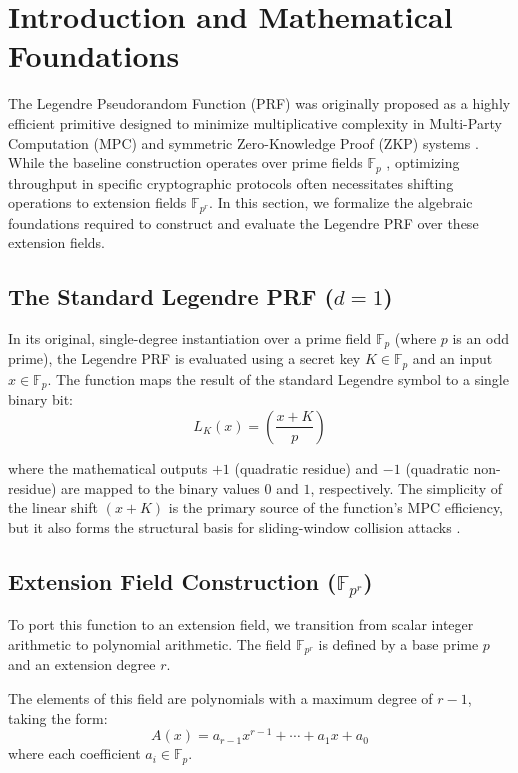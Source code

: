 \documentclass[runningheads]{llncs}
\begin{document}
\section{Introduction and Mathematical Foundations}
The Legendre Pseudorandom Function (PRF) was originally proposed as a highly efficient primitive designed to minimize multiplicative complexity in Multi-Party Computation (MPC) and symmetric Zero-Knowledge Proof (ZKP) systems \cite{grassi2016}. While the baseline construction operates over prime fields $\mathbb{F}_p$ \cite{damgard1988}, optimizing throughput in specific cryptographic protocols often necessitates shifting operations to extension fields $\mathbb{F}_{p^r}.$ In this section, we formalize the algebraic foundations required to construct and evaluate the Legendre PRF over these extension fields.

\subsection{The Standard Legendre PRF ($d = 1$)}
In its original, single-degree instantiation over a prime field $\mathbb{F}_p$ (where $p$ is an odd prime), the Legendre PRF is evaluated using a secret key $K \in \mathbb{F}_p$ and an input $x \in \mathbb{F}_p.$ The function maps the result of the standard Legendre symbol to a single binary bit:   
\begin{equation*}
    L_K(x) = \left(\frac{x + K}{p}\right)
\end{equation*}

where the mathematical outputs $+1$ (quadratic residue) and $-1$ (quadratic non-residue) are mapped to the binary values $0$ and $1$, respectively. The simplicity of the linear shift $(x + K)$ is the primary source of the function's MPC efficiency, but it also forms the structural basis for sliding-window collision attacks \cite{khovratovich2019,beullens2019}. 

\subsection{Extension Field Construction ($\mathbb{F}_{p^r}$)}
To port this function to an extension field, we transition from scalar integer arithmetic to polynomial arithmetic. The field $\mathbb{F}_{p^r}$ is defined by a base prime $p$ and an extension degree $r$.

The elements of this field are polynomials with a maximum degree of $r - 1$, taking the form: 
\begin{equation*}
    A(x) = a_{r-1}x^{r-1} + \cdots + a_1x + a_0
\end{equation*}
where each coefficient $a_i \in \mathbb{F}_p.$
\end{document}

